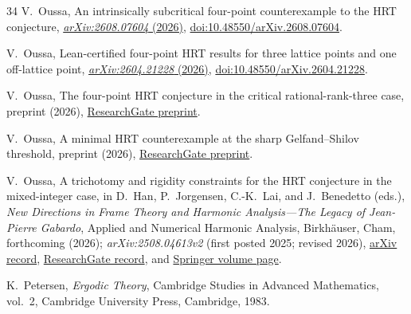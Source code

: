 \documentclass[reqno]{amsart}
\theoremstyle{remark}
\numberwithin{equation}{section}
\begin{document}
\begin{thebibliography}{34}
V.~Oussa,
An intrinsically subcritical four-point counterexample to the HRT conjecture,
\href{https://arxiv.org/abs/2608.07604}{\emph{arXiv:2608.07604} (2026)},
\href{https://doi.org/10.48550/arXiv.2608.07604}
{doi:10.48550/arXiv.2608.07604}.

V.~Oussa,
Lean-certified four-point HRT results for three lattice points and one
off-lattice point,
\href{https://arxiv.org/abs/2604.21228}{\emph{arXiv:2604.21228} (2026)},
\href{https://doi.org/10.48550/arXiv.2604.21228}
{doi:10.48550/arXiv.2604.21228}.

V.~Oussa,
The four-point HRT conjecture in the critical rational-rank-three case,
preprint (2026),
\href{https://www.researchgate.net/publication/410530065_The_Four-Point_HRT_Conjecture_in_the_Critical_Rational-Rank-Three_Case}
{ResearchGate preprint}.

V.~Oussa,
A minimal HRT counterexample at the sharp Gelfand--Shilov threshold,
preprint (2026),
\href{https://www.researchgate.net/publication/412311515_A_minimal_HRT_counterexample_at_the_sharp_Gelfand--Shilov_threshold}
{ResearchGate preprint}.

V.~Oussa,
A trichotomy and rigidity constraints for the HRT conjecture in the
mixed-integer case,
in D.~Han, P.~Jorgensen, C.-K.~Lai, and J.~Benedetto (eds.),
\emph{New Directions in Frame Theory and Harmonic Analysis---The Legacy of
Jean-Pierre Gabardo},
Applied and Numerical Harmonic Analysis,
Birkh\"auser, Cham, forthcoming (2026);
\emph{arXiv:2508.04613v2} (first posted 2025; revised 2026),
\href{https://arxiv.org/abs/2508.04613}{arXiv record},
\href{https://www.researchgate.net/publication/393472262_Trichotomy_for_the_HRT_Conjecture_for_mixed_integer_configuration}
{ResearchGate record}, and
\href{https://link.springer.com/book/9783032238504}
{Springer volume page}.

K.~Petersen,
\emph{Ergodic Theory},
Cambridge Studies in Advanced Mathematics, vol.~2,
Cambridge University Press, Cambridge, 1983.

\end{thebibliography}
\endgroup
\end{document}
